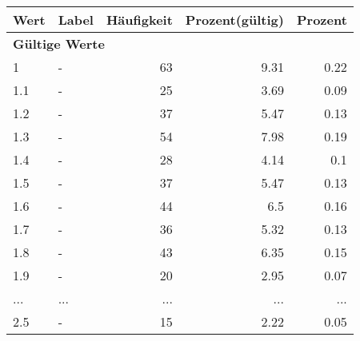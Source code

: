      \begin{longtable}{lXrrr}
     \toprule
     \textbf{Wert} & \textbf{Label} & \textbf{Häufigkeit} & \textbf{Prozent(gültig)} & \textbf{Prozent} \\
     \endhead
     \midrule
     \multicolumn{5}{l}{\textbf{Gültige Werte}}\\
        1 & \multicolumn{1}{X}{-} & %
          \num{63} &
          \num[round-mode=places,round-precision=2]{9,31} &
          \num[round-mode=places,round-precision=2]{0,22} \\
        1.1 & \multicolumn{1}{X}{-} & %
          \num{25} &
          \num[round-mode=places,round-precision=2]{3,69} &
          \num[round-mode=places,round-precision=2]{0,09} \\
        1.2 & \multicolumn{1}{X}{-} & %
          \num{37} &
          \num[round-mode=places,round-precision=2]{5,47} &
          \num[round-mode=places,round-precision=2]{0,13} \\
        1.3 & \multicolumn{1}{X}{-} & %
          \num{54} &
          \num[round-mode=places,round-precision=2]{7,98} &
          \num[round-mode=places,round-precision=2]{0,19} \\
        1.4 & \multicolumn{1}{X}{-} & %
          \num{28} &
          \num[round-mode=places,round-precision=2]{4,14} &
          \num[round-mode=places,round-precision=2]{0,1} \\
        1.5 & \multicolumn{1}{X}{-} & %
          \num{37} &
          \num[round-mode=places,round-precision=2]{5,47} &
          \num[round-mode=places,round-precision=2]{0,13} \\
        1.6 & \multicolumn{1}{X}{-} & %
          \num{44} &
          \num[round-mode=places,round-precision=2]{6,5} &
          \num[round-mode=places,round-precision=2]{0,16} \\
        1.7 & \multicolumn{1}{X}{-} & %
          \num{36} &
          \num[round-mode=places,round-precision=2]{5,32} &
          \num[round-mode=places,round-precision=2]{0,13} \\
        1.8 & \multicolumn{1}{X}{-} & %
          \num{43} &
          \num[round-mode=places,round-precision=2]{6,35} &
          \num[round-mode=places,round-precision=2]{0,15} \\
        1.9 & \multicolumn{1}{X}{-} & %
          \num{20} &
          \num[round-mode=places,round-precision=2]{2,95} &
          \num[round-mode=places,round-precision=2]{0,07} \\
       ... & ... & ... & ... & ... \\
        2.5 & \multicolumn{1}{X}{-} & %
          \num{15} &
          \num[round-mode=places,round-precision=2]{2,22} &
          \num[round-mode=places,round-precision=2]{0,05} \\


\end{longtable}

